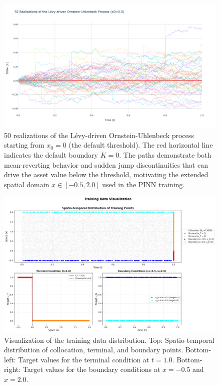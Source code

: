 \documentclass[11pt,twoside,openright]{report}
\begin{document}
\begin{figure}[htbp]
    \centering
    \includegraphics[width=\textwidth]{Figures/levy_ou_process_realizations.png}
    \caption{50 realizations of the Lévy-driven Ornstein-Uhlenbeck process starting from $x_0 = 0$ (the default threshold). The red horizontal line indicates the default boundary $K = 0$. The paths demonstrate both mean-reverting behavior and sudden jump discontinuities that can drive the asset value below the threshold, motivating the extended spatial domain $x \in [-0.5, 2.0]$ used in the PINN training.}
    \label{fig:ou_realizations}
\end{figure}

\begin{figure}[htbp]
    \centering
    \includegraphics[width=\textwidth]{Figures/training_data_viz_updated.png} %
    \caption{Visualization of the training data distribution. Top: Spatio-temporal distribution of collocation, terminal, and boundary points. Bottom-left: Target values for the terminal condition at $t=1.0$. Bottom-right: Target values for the boundary conditions at $x=-0.5$ and $x=2.0$.}
    \label{fig:training_data_viz}
\end{figure}
\end{document}
